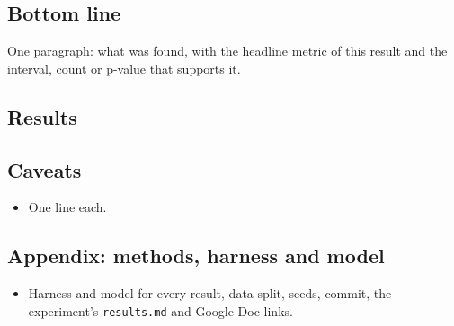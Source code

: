 
\subsection*{Bottom line}
One paragraph: what was found, with the headline metric of this result and the interval, count or p-value that supports it.

\subsection*{Results}

\subsection*{Caveats}
\begin{itemize}
  \item One line each.
\end{itemize}

\subsection*{Appendix: methods, harness and model}
\begin{itemize}
  \item Harness and model for every result, data split, seeds, commit, the experiment's \texttt{results.md} and Google Doc links.
\end{itemize}

